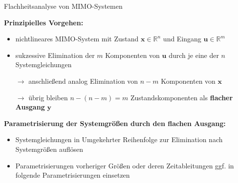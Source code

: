 \documentclass[
	ngerman,
	10pt,				%
	aspectratio=169 	%
]{beamer}
\begin{document}

\begin{frame}[t,fragile,label=Flachheit_2]{\large Flachheitsanalyse von MIMO-Systemen}
	
	\textbf{Prinzipielles Vorgehen:}
	\begin{itemize}
		\pause
		\item  nichtlineares MIMO-System mit Zustand $\mathbf{x} \in \mathbb{R}^n$ und Eingang $\mathbf{u} \in \mathbb{R}^m$
		\pause
		\item sukzessive Elimination der $m$ Komponenten von $\mathbf{u}$ durch je eine der $n$ Systemgleichungen
		\pause
		\item[$\rightarrow$] anschließend analog Elimination von $n - m$ Komponenten von $\mathbf{x}$
		\pause
		\item[$\rightarrow$] übrig bleiben $n - (n - m) = m $ Zustandskomponenten als \textbf{flacher Ausgang} $\mathbf{y}$
	\end{itemize}
	
	\bigskip
	\pause
	
	\textbf{Parametrisierung der Systemgrößen durch den flachen Ausgang:}
	\begin{itemize}
		\pause
		\item Systemgleichungen in Umgekehrter Reihenfolge zur Elimination nach Systemgrößen auflösen
		\pause
		\item Parametrisierungen vorheriger Größen oder deren Zeitableitungen ggf. in folgende Parametrisierungen einsetzen
	\end{itemize}
\end{frame}

\end{document}
